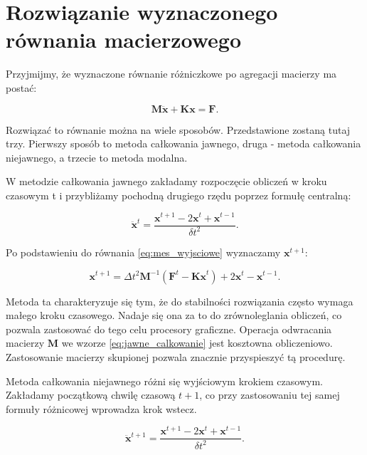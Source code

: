 
\section{Rozwiązanie wyznaczonego równania macierzowego}
\label{sec:rozwiazanie_r_roz}

Przyjmijmy, że wyznaczone równanie różniczkowe po agregacji macierzy ma postać:

\begin{equation} \label{eq:mes_wyjsciowe}
	\textbf{M} \ddot{\textbf{x}} + \textbf{Kx} = \textbf{F}.
\end{equation}

Rozwiązać to równanie można na wiele sposobów. Przedstawione zostaną tutaj trzy. Pierwszy sposób to metoda całkowania jawnego, druga - metoda całkowania niejawnego, a trzecie to metoda modalna.

W metodzie całkowania jawnego zakładamy rozpoczęcie obliczeń w kroku czasowym t i przybliżamy pochodną drugiego rzędu poprzez formułę centralną:

\begin{equation}
	\ddot{\textbf{x}}^t = \frac{\textbf{x}^{t+1} - 2\textbf{x}^t + \textbf{x}^{t-1}}{\delta t^2}.
\end{equation}

Po podstawieniu do równania \ref{eq:mes_wyjsciowe} wyznaczamy \( \textbf{x}^{t+1} \):

\begin{equation} \label{eq:jawne_calkowanie}
	\textbf{x}^{t+1} = \Delta t^2 \textbf{M}^{-1}(\textbf{F}^t - \textbf{Kx}^t) + 2\textbf{x}^t - \textbf{x}^{t-1}.
\end{equation}

Metoda ta charakteryzuje się tym, że do stabilności rozwiązania często wymaga małego kroku czasowego. Nadaje się ona za to do zrównoleglania obliczeń, co pozwala zastosować do tego celu procesory graficzne. Operacja odwracania macierzy \( \textbf{M} \) we wzorze \ref{eq:jawne_calkowanie} jest kosztowna obliczeniowo. Zastosowanie macierzy skupionej pozwala znacznie przyspieszyć tą procedurę.

Metoda całkowania niejawnego różni się wyjściowym krokiem czasowym. Zakładamy początkową chwilę czasową \( t+1 \), co przy zastosowaniu tej samej formuły różnicowej wprowadza krok wstecz.

\begin{equation} \label{eq:niejawne}
	\ddot{\textbf{x}}^{t+1} = \frac{\textbf{x}^{t+1} - 2\textbf{x}^t + \textbf{x}^{t-1}}{\delta t^2}.
\end{equation}

